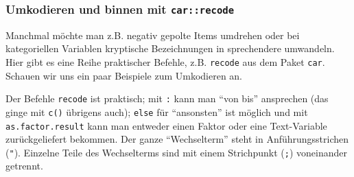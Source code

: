 \documentclass[12pt,ngerman,]{book}
\makeatletter
\newenvironment{Shaded}{\begin{snugshade}}{\end{snugshade}}
\newcommand{\KeywordTok}[1]{\textcolor[rgb]{0.13,0.29,0.53}{\textbf{{#1}}}}
\newcommand{\DataTypeTok}[1]{\textcolor[rgb]{0.13,0.29,0.53}{{#1}}}
\newcommand{\StringTok}[1]{\textcolor[rgb]{0.31,0.60,0.02}{{#1}}}
\newcommand{\CommentTok}[1]{\textcolor[rgb]{0.56,0.35,0.01}{\textit{{#1}}}}
\newcommand{\OtherTok}[1]{\textcolor[rgb]{0.56,0.35,0.01}{{#1}}}
\newcommand{\NormalTok}[1]{{#1}}
\newenvironment{kframe}{%
\medskip{}
\setlength{\fboxsep}{.8em}
 \def\at@end@of@kframe{}%
 \ifinner\ifhmode%
  \def\at@end@of@kframe{\end{minipage}}%
  \begin{minipage}{\columnwidth}%
 \fi\fi%
 \def\FrameCommand##1{\hskip\@totalleftmargin \hskip-\fboxsep
 \colorbox{shadecolor}{##1}\hskip-\fboxsep
     \hskip-\linewidth \hskip-\@totalleftmargin \hskip\columnwidth}%
 \MakeFramed {\advance\hsize-\width
   \@totalleftmargin\z@ \linewidth\hsize
   \@setminipage}}%
 {\par\unskip\endMakeFramed%
 \at@end@of@kframe}
\renewenvironment{Shaded}{\begin{kframe}}{\end{kframe}}
\makeatother
\begin{document}
\subsubsection{\texorpdfstring{Umkodieren und binnen mit
\texttt{car::recode}}{Umkodieren und binnen mit car::recode}}\label{umkodieren-und-binnen-mit-carrecode}

Manchmal möchte man z.B. negativ gepolte Items umdrehen oder bei
kategoriellen Variablen kryptische Bezeichnungen in sprechendere
umwandeln. Hier gibt es eine Reihe praktischer Befehle, z.B.
\texttt{recode} aus dem Paket \texttt{car}. Schauen wir uns ein paar
Beispiele zum Umkodieren an.

\begin{Shaded}
\end{Shaded}

Der Befehle \texttt{recode} ist praktisch; mit \texttt{:} kann man ``von
bis'' ansprechen (das ginge mit \texttt{c()} übrigens auch);
\texttt{else} für ``ansonsten'' ist möglich und mit
\texttt{as.factor.result} kann man entweder einen Faktor oder eine
Text-Variable zurückgeliefert bekommen. Der ganze ``Wechselterm'' steht
in Anführungsstrichen (\texttt{"}). Einzelne Teile des Wechselterms sind
mit einem Strichpunkt (\texttt{;}) voneinander getrennt.
\end{document}

